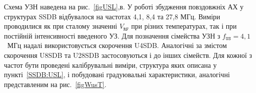 Схема УЗН наведена на рис.~\ref{figUSL},в.
У роботі збудження повздовжніх АХ у структурах SSDB відбувалося на частотах 4,1, 8,4 та 27,8 МГц.
Виміри проводилися як при сталому значенні $V_\mathtt{RF}$ при різних температурах, так і при постійній інтенсивності введеного УЗ.
Для позначення сімейства УЗН з $f_\mathtt{US}=4,1$~МГц надалі використовується скорочення U4SDB.
Аналогічні за змістом скорочення U8SDB та U28SDB застосовуються і до інших сімейств.
Для кожної з частот бути проведені калібрувальні виміри, структура яких описана у пункті~\ref{SSDB:USL}, і побудовані градуювальні характеристики,
аналогічні представленим на рис.~\ref{figWusT}.


